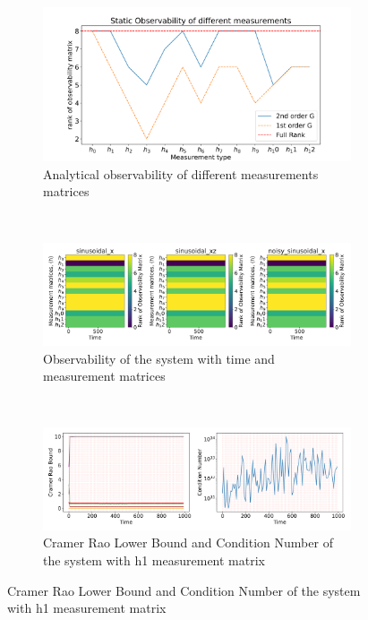 \documentclass[12pt]{article}
\begin{document}
\begin{figure}[H]
    \begin{subfigure}[t]{\textwidth}
        \centering
        \includegraphics[width=10cm]{figures/analytical_observability.png}
        \caption{Analytical observability of different measurements matrices}
        \label{fig:04a}
    \end{subfigure}
    \\
    \begin{subfigure}[t]{\textwidth}
        \centering
        \includegraphics[width=15cm]{figures/observability_with_time.png}
        \caption{Observability of the system with time and measurement matrices}
        \label{fig:04b}
    \end{subfigure}
    \\
    \begin{subfigure}[t]{\textwidth}
        \centering
        \includegraphics[width=15cm]{figures/crb_and_cn_with_noisy_sinusoidal_x_and_h1.png}
        \caption{Cramer Rao Lower Bound and Condition Number of the system with h1 measurement matrix}
        \label{fig:04c}
    \end{subfigure}

\end{figure}
\end{document}
